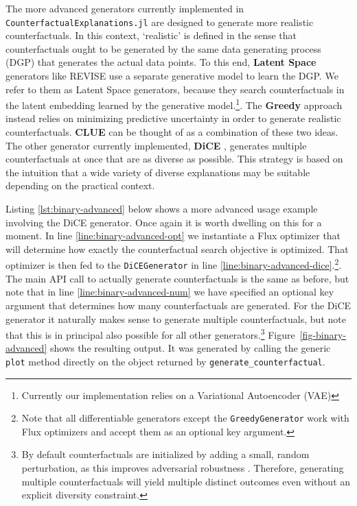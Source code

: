 \documentclass[
  letterpaper,
  DIV=11,
  numbers=noendperiod]{scrartcl}
\begin{document}
The more advanced generators currently implemented in
\texttt{CounterfactualExplanations.jl} are designed to generate more
realistic counterfactuals. In this context, `realistic' is defined in
the sense that counterfactuals ought to be generated by the same data
generating process (DGP) that generates the actual data points. To this
end, \textbf{Latent Space} generators like REVISE
\cite{joshi2019realistic} use a separate generative model to learn the
DGP. We refer to them as Latent Space generators, because they search
counterfactuals in the latent embedding learned by the generative
model.\footnote{Currently our implementation relies on a Variational
  Autoencoder (VAE)}. The \textbf{Greedy} approach
\cite{schut2021generating} instead relies on minimizing predictive
uncertainty in order to generate realistic counterfactuals.
\textbf{CLUE} \cite{antoran2020getting} can be thought of as a
combination of these two ideas. The other generator currently
implemented, \textbf{DiCE} \cite{mothilal2020explaining}, generates
multiple counterfactuals at once that are as diverse as possible. This
strategy is based on the intuition that a wide variety of diverse
explanations may be suitable depending on the practical context.

Listing \ref{lst:binary-advanced} below shows a more advanced usage
example involving the DiCE generator. Once again it is worth dwelling on
this for a moment. In line \ref{line:binary-advanced-opt} we instantiate
a Flux optimizer that will determine how exactly the counterfactual
search objective is optimized. That optimizer is then fed to the
\texttt{DiCEGenerator} in line
\ref{line:binary-advanced-dice}.\footnote{Note that all differentiable
  generators except the \texttt{GreedyGenerator} work with Flux
  optimizers and accept them as an optional key argument.}. The main API
call to actually generate counterfactuals is the same as before, but
note that in line \ref{line:binary-advanced-num} we have specified an
optional key argument that determines how many counterfactuals are
generated. For the DiCE generator it naturally makes sense to generate
multiple counterfactuals, but note that this is in principal also
possible for all other generators.\footnote{By default counterfactuals
  are initialized by adding a small, random perturbation, as this
  improves adversarial robustness \cite{slack2021counterfactual}.
  Therefore, generating multiple counterfactuals will yield multiple
  distinct outcomes even without an explicit diversity constraint.}
Figure~\ref{fig-binary-advanced} shows the resulting output. It was
generated by calling the generic \texttt{plot} method directly on the
object returned by \texttt{generate\_counterfactual}.
\end{document}
